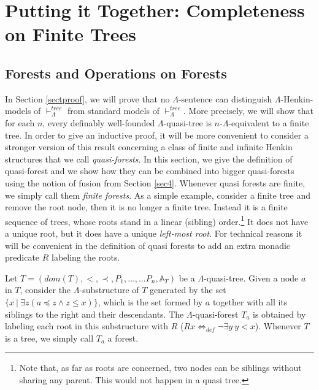 \documentclass{LMCS}
\begin{document}
\section{Putting it Together: Completeness on Finite Trees}
\label{sec5}

\subsection{Forests and Operations on Forests}

In Section \ref{sectproof}, we will prove that no $\Lambda$-sentence can
distinguish $\Lambda$-Henkin-models of $\vdash_\Lambda^{tree}$
from standard models of $\vdash_\Lambda^{tree}$. More precisely,
we will show that for each $n$, every definably
well-founded $\Lambda$-quasi-tree is $n$-$\Lambda$-equivalent to a finite
tree. In order to give an inductive proof, it will be more convenient
to consider a stronger version of this result concerning a class of finite and infinite Henkin
structures that we call \textit{quasi-forests}. In this section, we give the definition of quasi-forest and we show how they can be combined into bigger quasi-forests using the notion of fusion from Section \ref{sec4}. Whenever quasi forests are finite, we simply call them \emph{finite
forests}. As a simple example, consider a finite tree and remove the root node, then it is no longer a finite tree. Instead it is a finite sequence of trees, whose roots stand in a linear (sibling)
order.\footnote{Note that, as far as roots are concerned, two
nodes can be siblings without sharing any parent. This would not
happen in a quasi tree.} It does not have a unique root, but it does have a
unique \emph{left-most root}. For technical reasons it will be convenient in the definition of quasi forests to add an extra monadic predicate $R$ labeling the roots.

\begin{defi}
Let $T=(dom(T),<,\prec,P_1,\ldots,\ldots P_n, \mathbb{A}_T)$ be a
$\Lambda$-quasi-tree. Given a node $a$ in $T$, consider the $\Lambda$-substructure of
$T$ generated by the set $\{x ~|~\exists z (a \preceq z\wedge z \leq x)\}$, which is the set formed by $a$
together with all its siblings to the right and their descendants.
The $\Lambda$-quasi-forest $T_a$ is obtained by labeling each
root in this substructure with $R$ ($Rx \Leftrightarrow_{def} \neg
\exists y~ y<x$). Whenever $T$ is a tree, we simply call $T_a$ a
forest.
\end{defi}
\end{document}
